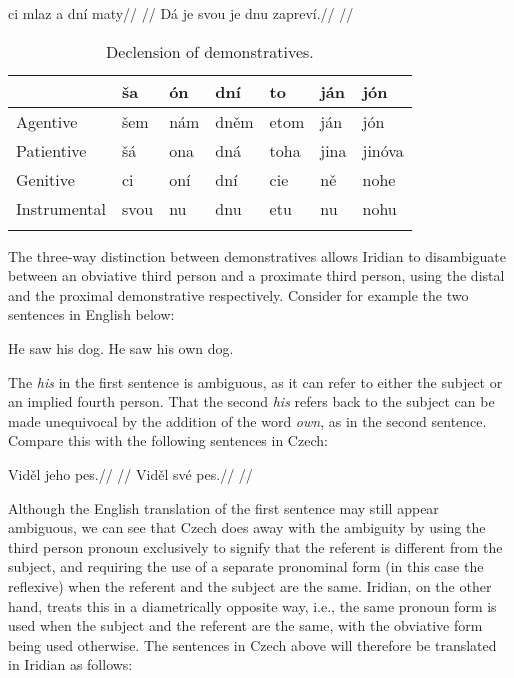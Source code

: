 \pex
\a{}
\begingl
\gla ci mlaz a dní maty//
\glft {}//
\endgl
\a{}
\begingl
\gla Dá je svou je dnu zapreví.//
\glft {}//
\endgl
\xe

\begin{table}
\footnotesize\sffamily
	\caption{Declension of demonstratives.}
    \medskip
	\begin{tabu}to \textwidth{Y[2]YYYYYY}
		\toprule
						& {ša}	& {ón}	&{dní}& {to}	& {ján}	&{jón}\\
		\midrule \addlinespace
		Agentive&šem&nám&dněm&etom&ján&jón\\\addlinespace
		Patientive&šá&ona&dná&toha&jina&jinóva\\\addlinespace
		Genitive&ci&oní&dní&cie&ně&nohe\\\addlinespace
		Instrumental&svou&nu&dnu&etu&nu&nohu\\\addlinespace
		\bottomrule
		\label{dem-conj}
	\end{tabu}
\end{table}

The three-way distinction between demonstratives allows Iridian to disambiguate between an obviative third person and a proximate third person, using the distal and the proximal demonstrative respectively. Consider for example the two sentences in English below:

\pex
\a He saw his dog.
\a He saw his own dog.\smallskip
\xe

The \emph{his} in the first sentence is ambiguous, as it can refer to either the subject or an implied fourth person. That the second \emph{his} refers back to the subject can be made unequivocal by the addition of the word \emph{own}, as in the second sentence. Compare this with the following sentences in Czech:

\begin{multicols}{2}
  \pex
  \a
  \begingl
  \gla Viděl jeho pes.//
  \glft {}//
  \endgl
  \a \begingl
  \gla Viděl své pes.//
  \glft {}//
  \endgl
  \xe
\end{multicols}

Although the English translation of the first sentence may still appear ambiguous, we can see that Czech does away with the ambiguity by using the third person pronoun  exclusively to signify that the referent is different from the subject, and requiring the use of a separate pronominal form (in this case the reflexive) when the referent and the subject are the same. Iridian, on the other hand, treats this in a diametrically opposite way, i.e., the same pronoun form is used when the subject and the referent are the same, with the obviative form being used otherwise. The sentences in Czech above will therefore be translated in Iridian as follows:


